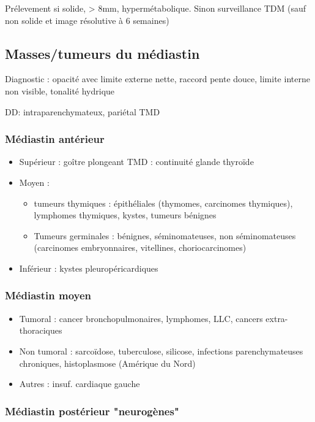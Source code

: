 \documentclass{book}
\begin{document}
Prélevement si solide, > 8mm, hypermétabolique. Sinon surveillance TDM (sauf non solide et image résolutive à 6 semaines)

\subsection{Masses/tumeurs du médiastin}
\label{sec:org65ac974}
Diagnostic : opacité avec limite externe nette, raccord pente douce, limite interne non
visible, tonalité hydrique

DD: intraparenchymateux, pariétal \thus TMD

\subsubsection{Médiastin antérieur}
\label{sec:org6d20e7d}

\begin{itemize}
\item Supérieur : goître plongeant \thus TMD : continuité glande thyroïde
\item Moyen : 

\begin{itemize}
\item tumeurs thymiques : épithéliales (thymomes, carcinomes thymiques),
lymphomes thymiques, kystes, tumeurs bénignes
\item Tumeurs germinales : bénignes, séminomateuses, non séminomateuses
(carcinomes embryonnaires, vitellines, choriocarcinomes)
\end{itemize}

\item Inférieur : kystes pleuropéricardiques
\end{itemize}


\subsubsection{Médiastin moyen}
\label{sec:orgf9775ff}

\begin{itemize}
\item Tumoral : cancer bronchopulmonaires, lymphomes, LLC, cancers
extra-thoraciques
\item Non tumoral : sarcoïdose, tuberculose, silicose, infections
parenchymateuses chroniques, histoplasmose (Amérique du Nord)
\item Autres : insuf. cardiaque gauche
\end{itemize}


\subsubsection{Médiastin postérieur "neurogènes"}
\label{sec:orga6d954a}
\end{document}
